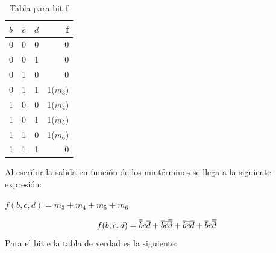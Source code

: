 \begin{table}[h!]
	\begin{center}
		\caption{Tabla para bit f}
		\vspace{5mm}
		\begin{tabular}{l|c|c|r}
			\textbf{$\overline{b}$} & \textbf{$\overline{c}$} & \textbf{$\overline{d}$} & \textbf{f} \\
			\hline
			0                       & 0                       & 0                       & 0          \\
			0                       & 0                       & 1                       & 0          \\	
			0                       & 1                       & 0                       & 0          \\
			0                       & 1                       & 1                       & 1($m_{3}$) \\
			1                       & 0                       & 0                       & 1($m_{4}$) \\
			1                       & 0                       & 1                       & 1($m_{5}$) \\	
			1                       & 1                       & 0                       & 1($m_{6}$) \\
			1                       & 1                       & 1                       & 0          \\				
		\end{tabular}
	\end{center}
\end{table}
Al escribir la salida en función de los mintérminos se llega a la siguiente expresión:
\centerline{$f(b,c,d)=m_{3}+m_{4}+m_{5}+m_{6}$}
\begin{equation}
	\centerline{$f(b,c,d)=\overline{\overline{b}}\overline{c}\overline{d}+\overline{b}\overline{\overline{c}}\overline{\overline{d}}+\overline{b}\overline{\overline{c}}\overline{d}+\overline{b}\overline{c}\overline{\overline{d}}$}
\end{equation}
Para el bit e la tabla de verdad es la siguiente:
